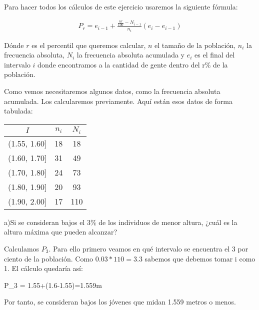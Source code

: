 Para hacer todos los cálculos de este ejercicio usaremos la siguiente fórmula:

\begin{gather}\tag{Percentil}
    P_{r} = e_{i-1}+\frac{\frac{nr}{100}-N_{i-1}}{n_{i}}(e_{i}-e_{i-1})
\end{gather}

Dónde $r$ es el percentil que queremos calcular, $n$ el tamaño de la población, $n_{i}$ la frecuencia absoluta, $N_{i}$ la frecuencia absoluta acumulada y $e_{i}$ es el final del intervalo $i$ donde encontramos a la cantidad de gente dentro del r\% de la población.

Como vemos necesitaremos algunos datos, como la frecuencia absoluta acumulada. Los calcularemos previamente. Aquí están esos datos de forma tabulada:

\begin{center}
	\begin{table}[htbp]
		\begin{center}
			\begin{tabular}{|c|c|c|}
				\hline
				$I$ & $n_{i}$ & $N_{i}$\\\hline
				(1.55, 1.60] & 18 & 18 \\ \hline
				(1.60, 1.70] & 31 & 49 \\ \hline
				(1.70, 1.80] & 24 & 73 \\ \hline
				(1.80, 1.90] & 20 & 93 \\ \hline
				(1.90, 2.00] & 17 & 110 \\ \hline
			\end{tabular}
		\end{center}
	\end{table}
\end{center}

a)Si se consideran bajos el 3\% de los individuos de menor altura, ¿cuál es la altura máxima que pueden alcanzar?

Calculamos $P_{3}$. Para ello primero veamos en qué intervalo se encuentra el 3 por ciento de la población. Como $0.03*110=3.3$ sabemos que debemos tomar i como 1. El cálculo quedaría así:
\\
\begin{center}
    \begin{*gather}
        P_{3} = 1.55+(1.6-1.55)=1.559m
    \end{*gather}
\end{center}

Por tanto, se consideran bajos los jóvenes que midan 1.559 metros o menos.

